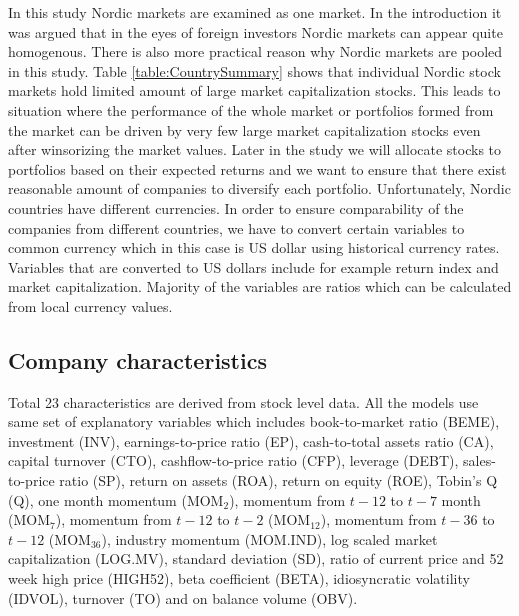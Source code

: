 \documentclass{article}
\begin{document}
In this study Nordic markets are examined as one market. In the introduction it was argued that in the eyes of foreign investors Nordic markets can appear quite homogenous. There is also more practical reason why Nordic markets are pooled in this study. Table \ref{table:CountrySummary} shows that individual Nordic stock markets hold limited amount of large market capitalization stocks. This leads to situation where the performance of the whole market or portfolios formed from the market can be driven by very few large market capitalization stocks even after winsorizing the market values. Later in the study we will allocate stocks to portfolios based on their expected returns and we want to ensure that there exist reasonable amount of companies to diversify each portfolio. Unfortunately, Nordic countries have different currencies. In order to ensure comparability of the companies from different countries, we have to convert certain variables to common currency which in this case is US dollar using historical currency rates. Variables that are converted to US dollars include for example return index and market capitalization. Majority of the variables are ratios which can be calculated from local currency values. \par

\subsection{Company characteristics}\label{CompanyCharacteristics}

Total 23 characteristics are derived from stock level data. All the models use same set of explanatory variables which includes book-to-market ratio (BEME), investment (INV), earnings-to-price ratio (EP), cash-to-total assets ratio (CA), capital turnover (CTO), cashflow-to-price ratio (CFP), leverage (DEBT), sales-to-price ratio (SP), return on assets (ROA), return on equity (ROE), Tobin's Q (Q), one month momentum (MOM$_2$), momentum from $t-12$ to $t-7$ month (MOM$_7$), momentum from $t-12$ to $t-2$ (MOM$_{12}$), momentum from $t-36$ to $t-12$ (MOM$_{36}$), industry momentum (MOM.IND), log scaled market capitalization (LOG.MV), standard deviation (SD), ratio of current price and 52 week high price (HIGH52), beta coefficient (BETA), idiosyncratic volatility (IDVOL), turnover (TO) and on balance volume (OBV). \par
\end{document}
